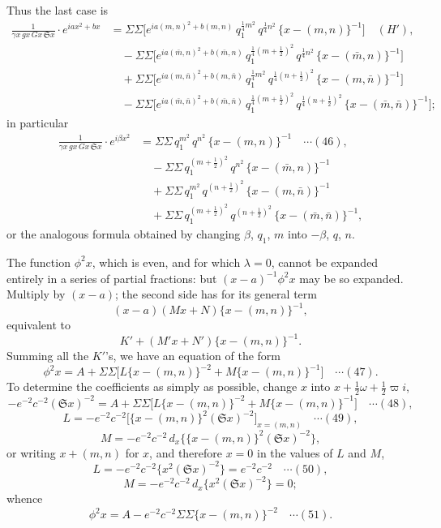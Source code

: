 \documentclass[12pt,a4paper]{article}
\providecommand{\fS}{\mathfrak{S}}
\providecommand{\mn}{(m,n)}
\providecommand{\mbn}{(\bar m,n)}
\providecommand{\mnb}{(m,\bar n)}
\providecommand{\mbnb}{(\bar m,\bar n)}
\begin{document}
Thus the last case is
\begin{align*}
\frac{1}{\gamma x\,g x\,G x\,\fS x}\cdot e^{iax^2+bx}
 &= \Sigma\Sigma\bigl[e^{ia\mn^2 + b\mn}\, q_1^{\frac14 m^2}\, q^{\frac14 n^2}\, \{x-\mn\}^{-1}\bigr] \quad(H'),\\
 &\quad - \Sigma\Sigma\bigl[e^{ia\mbn^2 + b\mbn}\, q_1^{\frac14 (m+\frac12)^2}\, q^{\frac14 n^2}\, \{x-\mbn\}^{-1}\bigr]\\
 &\quad + \Sigma\Sigma\bigl[e^{ia\mnb^2 + b\mnb}\, q_1^{\frac14 m^2}\, q^{\frac14 (n+\frac12)^2}\, \{x-\mnb\}^{-1}\bigr]\\
 &\quad - \Sigma\Sigma\bigl[e^{ia\mbnb^2 + b\mbnb}\, q_1^{\frac14 (m+\frac12)^2}\, q^{\frac14 (n+\frac12)^2}\, \{x-\mbnb\}^{-1}\bigr];
\end{align*}
in particular
\begin{align*}
\frac{1}{\gamma x\,g x\,G x\,\fS x}\cdot e^{i\beta x^2}
 &= \Sigma\Sigma\, q_1^{m^2}\, q^{n^2}\, \{x-\mn\}^{-1} \quad\cdots(46),\\
 &\quad - \Sigma\Sigma\, q_1^{(m+\frac12)^2}\, q^{n^2}\, \{x-\mbn\}^{-1}\\
 &\quad + \Sigma\Sigma\, q_1^{m^2}\, q^{(n+\frac12)^2}\, \{x-\mnb\}^{-1}\\
 &\quad + \Sigma\Sigma\, q_1^{(m+\frac12)^2}\, q^{(n+\frac12)^2}\, \{x-\mbnb\}^{-1},
\end{align*}
or the analogous formula obtained by changing $\beta$, $q_1$, $m$ into $-\beta$, $q$, $n$.

The function $\phi^2 x$, which is even, and for which $\lambda = 0$, cannot be expanded entirely in a series of partial fractions: but $(x-a)^{-1}\phi^2 x$ may be so expanded. Multiply by $(x-a)$; the second side has for its general term
\[
(x-a)(Mx+N)\{x-\mn\}^{-1},
\]
equivalent to
\[
K' + (M'x+N')\{x-\mn\}^{-1}.
\]
Summing all the $K'$'s, we have an equation of the form
\[
\phi^2 x = A + \Sigma\Sigma\bigl[L\{x-\mn\}^{-2} + M\{x-\mn\}^{-1}\bigr] \quad\cdots(47).
\]
To determine the coefficients as simply as possible, change $x$ into $x + \tfrac{1}{2}\omega + \tfrac{1}{2}\varpi i$,
\[
-e^{-2}c^{-2}(\fS x)^{-2} = A + \Sigma\Sigma\bigl[L\{x-\mn\}^{-2} + M\{x-\mn\}^{-1}\bigr] \quad\cdots(48),
\]
\[
L = -e^{-2}c^{-2}\bigl[\{x-\mn\}^2 (\fS x)^{-2}\bigr]_{x=\mn} \quad\cdots(49),
\]
\[
M = -e^{-2}c^{-2}\, d_x\bigl\{\{x-\mn\}^2 (\fS x)^{-2}\bigr\},
\]
or writing $x + \mn$ for $x$, and therefore $x = 0$ in the values of $L$ and $M$,
\[
L = -e^{-2}c^{-2}\bigl\{x^2 (\fS x)^{-2}\bigr\} = e^{-2}c^{-2} \quad\cdots(50),
\]
\[
M = -e^{-2}c^{-2}\, d_x\bigl\{x^2 (\fS x)^{-2}\bigr\} = 0;
\]
whence
\[
\phi^2 x = A - e^{-2}c^{-2}\Sigma\Sigma\{x-\mn\}^{-2} \quad\cdots(51).
\]
\end{document}

